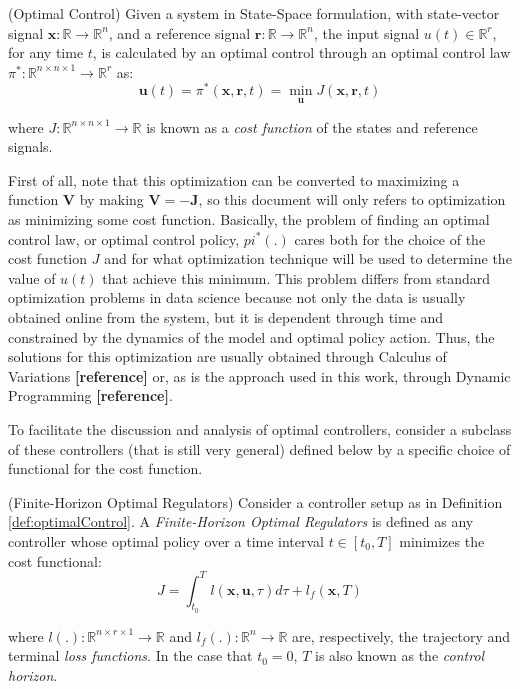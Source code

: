 \documentclass[a4paper,11pt]{book}
\numberwithin{figure}{chapter}
\numberwithin{equation}{chapter}
\numberwithin{table}{chapter}
\theoremstyle{definition}
\newtheorem{definition}{Definition}[chapter]
\newcounter{boxed-theorem}
\newcounter{boxed-definition}
\newenvironment{boxed-definition}[1]
{\begin{shaded} \begin{definition}{#1}}
{\end{definition} \end{shaded}}
\begin{document}
\begin{boxed-definition}{(Optimal Control)} \label{def:optimalControl}
Given a system in State-Space formulation, with state-vector signal $\bm{x} : \mathbb{R} \rightarrow \mathbb{R}^{n}$, and a reference signal $\bm{r} : \mathbb{R} \rightarrow \mathbb{R}^{n}$, the input signal $u(t) \in \mathbb{R}^r$, for any time $t$, is calculated by an optimal control through an optimal control law $\pi^* : \mathbb{R}^{n \times n \times 1} \rightarrow \mathbb{R}^r$ as:
    \begin{equation}
        \bm{u}(t) = \pi^*(\bm{x}, \bm{r}, t) = \min_{\bm{u}} J(\bm{x}, \bm{r}, t)
    \end{equation}
    
\noindent where $J : \mathbb{R}^{n \times n \times 1} \rightarrow \mathbb{R}$ is known as a \textit{cost function} of the states and reference signals.
\end{boxed-definition}

First of all, note that this optimization can be converted to maximizing a function $\bm{V}$ by making $\bm{V} = -\bm{J}$, so this document will only refers to optimization as minimizing some cost function. Basically, the problem of finding an optimal control law, or optimal control policy, $pi^*(.)$ cares both for the choice of the cost function $J$ and for what optimization technique will be used to determine the value of $u(t)$ that achieve this minimum. This problem differs from standard optimization problems in data science because not only the data is usually obtained online from the system, but it is dependent through time and constrained by the dynamics of the model and optimal policy action. Thus, the solutions for this optimization are usually obtained through Calculus of Variations \textbf{[reference]} or, as is the approach used in this work, through Dynamic Programming \textbf{[reference]}.

To facilitate the discussion and analysis of optimal controllers, consider a subclass of these controllers (that is still very general) defined below by a specific choice of functional for the cost function.

\begin{boxed-definition}{(Finite-Horizon Optimal Regulators)} \label{def:finiteHorizonOC}
    Consider a controller setup as in Definition \ref{def:optimalControl}. A \textit{Finite-Horizon Optimal Regulators} is defined as any controller whose optimal policy over a time interval $t \in [t_0, T]$ minimizes the cost functional:
    \begin{equation}
        J = \int_{t_0}^T l(\bm{x}, \bm{u}, \tau) d \tau + l_f(\bm{x}, T)
    \end{equation}
    
    \noindent where $l(.) : \mathbb{R}^{n \times r \times 1} \rightarrow \mathbb{R}$ and $l_f(.) : \mathbb{R}^{n} \rightarrow \mathbb{R}$ are, respectively, the trajectory and terminal \textit{loss functions}. In the case that $t_0 = 0$, $T$ is also known as the \textit{control horizon}.
\end{boxed-definition}
\end{document}

